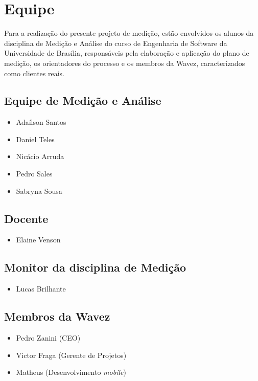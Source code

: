 \chapter{Equipe}

Para a realização do presente projeto de medição, estão envolvidos os alunos da disciplina de Medição e Análise do curso de Engenharia de Software da Universidade de Brasília, responsáveis pela elaboração e aplicação do plano de medição, os orientadores do processo e os membros da Wavez, caracterizados como clientes reais.

\section{Equipe de Medição e Análise}
\begin{itemize}
\item Adaílson Santos
\item Daniel Teles
\item Nicácio Arruda
\item Pedro Sales
\item Sabryna Sousa
\end{itemize}

\section{Docente}
\begin{itemize}
\item Elaine Venson
\end{itemize}

\section{Monitor da disciplina de Medição}
\begin{itemize}
\item Lucas Brilhante
\end{itemize}

\section{Membros da Wavez}
\begin{itemize}
\item Pedro Zanini (CEO)
\item Victor Fraga (Gerente de Projetos)
\item Matheus (Desenvolvimento \textit{mobile})
\end{itemize}
